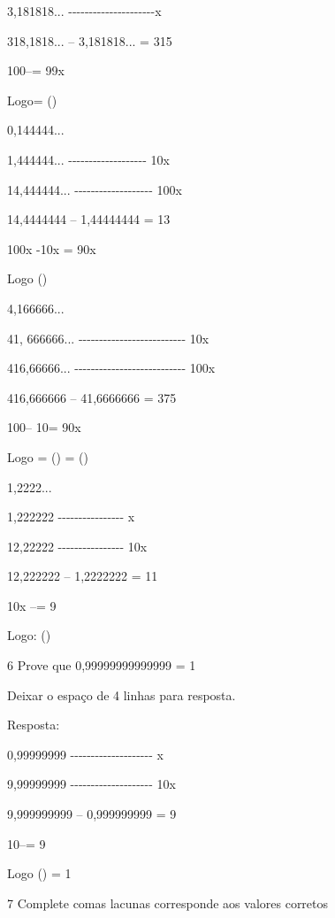 3,181818...
-\/-\/-\/-\/-\/-\/-\/-\/-\/-\/-\/-\/-\/-\/-\/-\/-\/-\/-\/-\/-x

318,1818... -- 3,181818... = 315

100\times --\times = 99x

Logo= ()

\item 0,144444...

1,444444... -\/-\/-\/-\/-\/-\/-\/-\/-\/-\/-\/-\/-\/-\/-\/-\/-\/-\/- 10x

14,444444... -\/-\/-\/-\/-\/-\/-\/-\/-\/-\/-\/-\/-\/-\/-\/-\/-\/-\/-
100x

14,4444444 -- 1,44444444 = 13

100x -10x = 90x

Logo ()

\item 4,166666...

41, 666666...
-\/-\/-\/-\/-\/-\/-\/-\/-\/-\/-\/-\/-\/-\/-\/-\/-\/-\/-\/-\/-\/-\/-\/-\/-\/-
10x

416,66666...
-\/-\/-\/-\/-\/-\/-\/-\/-\/-\/-\/-\/-\/-\/-\/-\/-\/-\/-\/-\/-\/-\/-\/-\/-\/-\/-
100x

416,666666 -- 41,6666666 = 375

100\times -- 10\times = 90x

Logo = () = ()

\item 1,2222...

1,222222 -\/-\/-\/-\/-\/-\/-\/-\/-\/-\/-\/-\/-\/-\/-\/- x

12,22222 -\/-\/-\/-\/-\/-\/-\/-\/-\/-\/-\/-\/-\/-\/-\/- 10x

12,222222 -- 1,2222222 = 11

10x --\times = 9

Logo: ()

\num{6} Prove que 0,99999999999999 = 1

Deixar o espaço de 4 linhas para resposta.

Resposta:

0,99999999 -\/-\/-\/-\/-\/-\/-\/-\/-\/-\/-\/-\/-\/-\/-\/-\/-\/-\/-\/- x

9,99999999 -\/-\/-\/-\/-\/-\/-\/-\/-\/-\/-\/-\/-\/-\/-\/-\/-\/-\/-\/-
10x

9,999999999 -- 0,999999999 = 9

10\times --\times = 9

Logo () = 1

\num{7} Complete com\times as lacunas corresponde aos valores corretos


